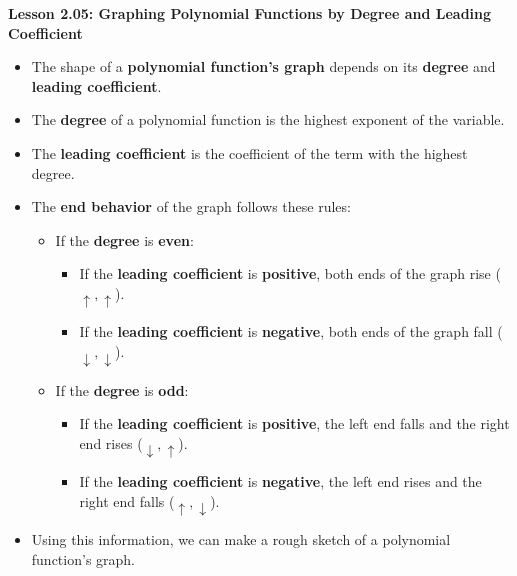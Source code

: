 \begin{center}
\textbf{Lesson 2.05: Graphing Polynomial Functions by Degree and Leading Coefficient}
\end{center}

\vspace*{-1.5ex}

\begin{itemize}
    \item The shape of a \textbf{polynomial function's graph} depends on its \textbf{degree} and \textbf{leading coefficient}.
    \item The \textbf{degree} of a polynomial function is the highest exponent of the variable.
    \item The \textbf{leading coefficient} is the coefficient of the term with the highest degree.
    \item The \textbf{end behavior} of the graph follows these rules:
    \begin{itemize}
        \item If the \textbf{degree} is \textbf{even}:
        \begin{itemize}
            \item If the \textbf{leading coefficient} is \textbf{positive}, both ends of the graph rise (\(\uparrow, \uparrow\)).
            \item If the \textbf{leading coefficient} is \textbf{negative}, both ends of the graph fall (\(\downarrow, \downarrow\)).
        \end{itemize}
        \item If the \textbf{degree} is \textbf{odd}:
        \begin{itemize}
            \item If the \textbf{leading coefficient} is \textbf{positive}, the left end falls and the right end rises (\(\downarrow, \uparrow\)).
            \item If the \textbf{leading coefficient} is \textbf{negative}, the left end rises and the right end falls (\(\uparrow, \downarrow\)).
        \end{itemize}
    \end{itemize}
    \item Using this information, we can make a rough sketch of a polynomial function’s graph.
\end{itemize}

